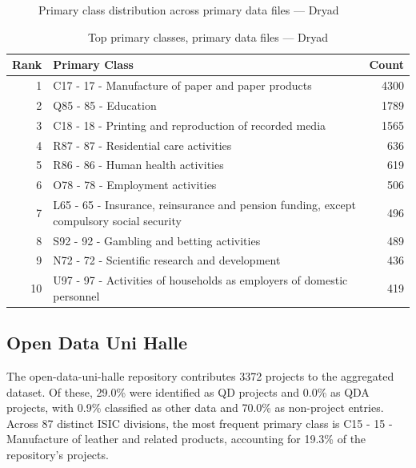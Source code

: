 \clearpage

\begin{figure}[H]
    \centering
    
    \caption{Primary class distribution across primary data files --- Dryad}
\end{figure}

\begin{table}[H]
    \centering
    \begin{tabular}{r p{10cm} r}
    \hline
    \textbf{Rank} & \textbf{Primary Class} & \textbf{Count} \\
    \hline
    1 & C17 - 17 - Manufacture of paper and paper products & 4300 \\
    2 & Q85 - 85 - Education & 1789 \\
    3 & C18 - 18 - Printing and reproduction of recorded media & 1565 \\
    4 & R87 - 87 - Residential care activities & 636 \\
    5 & R86 - 86 - Human health activities & 619 \\
    6 & O78 - 78 - Employment activities & 506 \\
    7 & L65 - 65 - Insurance, reinsurance and pension funding, except compulsory social security & 496 \\
    8 & S92 - 92 - Gambling and betting activities & 489 \\
    9 & N72 - 72 - Scientific research and development & 436 \\
    10 & U97 - 97 - Activities of households as employers of domestic personnel & 419 \\
    \hline
    \end{tabular}
    \caption{Top primary classes, primary data files --- Dryad}
\end{table}

\clearpage

\subsection{Open Data Uni Halle}


The open-data-uni-halle repository contributes 3372 projects to the aggregated dataset. Of these, 29.0\% were identified as QD projects and 0.0\% as QDA projects, with 0.9\% classified as other data and 70.0\% as non-project entries. Across 87 distinct ISIC divisions, the most frequent primary class is C15 - 15 - Manufacture of leather and related products, accounting for 19.3\% of the repository's projects.


